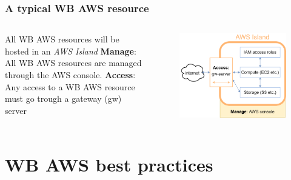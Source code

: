 \documentclass[aspectratio=169]{beamer} %
\begin{document}
\begin{frame}
\frametitle{A typical WB AWS resource}

	\begin{columns}[c]
		\large All WB AWS resources will be hosted in an \textit{AWS Island}
		\vspace{.7cm}\newline
		\large \textbf{Manage}: All WB AWS resources are managed through the AWS console.
		\vspace{.7cm}\newline
		\large \textbf{Access}: Any access to a WB AWS resource must go trough a gateway (gw) server
		
		\begin{figure}
			\centering
			\includegraphics[width=\textwidth]{./img/wb-aws.png}
		\end{figure}

	\end{columns}
\end{frame}

\section{WB AWS best practices}
\end{document}
